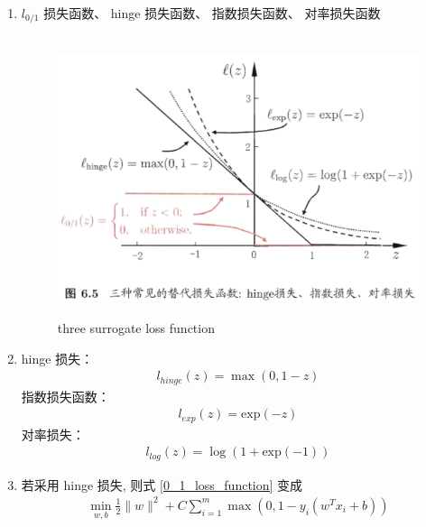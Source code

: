 \documentclass[oneside, 12pt]{ctexbook}
\begin{document}
\begin{enumerate}
					\item $l_{0/1}$ 损失函数、 hinge 损失函数、 指数损失函数、 对率损失函数
					 	\begin{figure}[H]
						 	\vspace{-0.2cm}  %
						 	\setlength{\abovecaptionskip}{-0.2cm}   %
						 	\centering
						 	\includegraphics[scale=0.8]{three_surrogate_loss_function.png}
						 	\renewcommand{\figurename}{Fig} %
						 	\caption{three surrogate loss function}
						 	\label{Fig:three_surrogate_loss_function}
					 	\end{figure}
					
					\item hinge 损失：
							\begin{align}
								l_{hinge}(z) = \max(0, 1-z)
							\end{align}
						  指数损失函数：
						  	\begin{align}
						  		l_{exp}(z) = \text{exp}(-z)
						  	\end{align}
						  对率损失：
						  	\begin{align}
						  		l_{log}(z) = \log(1 + \text{exp}(-1))
						  	\end{align}
						  	
					\item 若采用 hinge 损失, 则式 \ref{0_1_loss_function} 变成
						\begin{align}
							\min\limits_{w,b} \frac{1}{2} \parallel w \parallel ^2 + C\sum_{i=1}^{m} \max(0, 1 - y_i(w^T x_i + b)) \label{hinge_loss_function}
						\end{align}
					

\end{enumerate}
\end{document}
